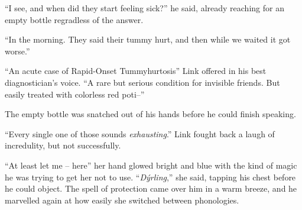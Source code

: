 \documentclass[../../FGP.tex]{subfiles}
\begin{document}
``I see, and when did they start feeling sick?'' he said, already reaching for an empty bottle regradless of the answer. 

``In the morning. They said their tummy hurt, and then while we waited it got worse.''%

``An acute case of Rapid-Onset Tummyhurtosis'' Link offered in his best diagnostician's voice. ``A rare but serious condition for invisible friends. But easily treated with colorless red poti--''

The empty bottle was snatched out of his hands before he could finish speaking. 



``Every single one of those sounds \emph{exhausting}.'' Link fought back a laugh of incredulity, but not successfully. 

``At least let me -- here'' her hand glowed bright and blue with the
kind of magic he was trying to get her not to use. ``\emph{Dýrling},'' she said, tapping his chest before he could object. The spell of protection came over him in a warm breeze, and he marvelled again at how easily she switched between phonologies.
\end{document}
